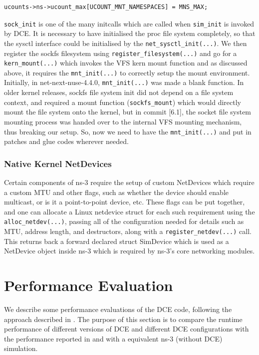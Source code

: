 \documentclass{sig-alternate}
\begin{document}
\begin{lstlisting}[style=CStyle]
ucounts->ns->ucount_max[UCOUNT_MNT_NAMESPACES] = MNS_MAX;
\end{lstlisting}

\sloppy\texttt{sock\_init} is one of the many initcalls which are called when 
\texttt{sim\_init} is invoked by DCE. It is necessary to have initialised the proc file system completely,
so that the sysctl interface could be initialised by the \texttt{net\_sysctl\_init(...)}. We then register the sockfs filesystem using \texttt{register\_filesystem(...)} 
and go for a \texttt{kern\_mount(...)} which invokes the VFS kern mount function and as discussed above, it requires the \texttt{mnt\_init(...)} to correctly setup 
the mount environment. Initially, in net-next-nuse-4.4.0, \texttt{mnt\_init(...)}  was made a blank function.
In older kernel releases, sockfs file system init did not depend on a file system context, and required a mount function (\texttt{sockfs\_mount}) which
would directly mount the file system onto the kernel, but in commit [6.1], the socket file system mounting process was handed over to the
internal VFS mounting mechanism, thus breaking our setup. So, now we need to have the \texttt{mnt\_init(...)} and put in patches and glue codes wherever
needed.

\subsubsection{Native Kernel NetDevices}
Certain components of ns-3 require the setup of custom NetDevices which require a custom MTU and other flags, such as whether the device should enable multicast, 
or is it a point-to-point device, etc. These flags can be put together, and one can allocate a Linux netdevice struct for each such requirement using
the \texttt{alloc\_netdev(...)}, passing all of the configuration needed for details such as MTU, address length, and destructors, along with a \texttt{register\_netdev(...)} call.
This returns back a forward declared struct SimDevice which is used as a NetDevice object inside ns-3 which is required by ns-3's core networking modules.

\section{Performance Evaluation}
We describe some performance evaluations of the DCE code, following the
approach described in \cite{Tazaki13}.  The purpose of this section is to
compare the runtime performance of different versions of DCE and different
DCE configurations with the performance reported in \cite{Tazaki13} and with
a equivalent ns-3 (without DCE) simulation.
\end{document}
